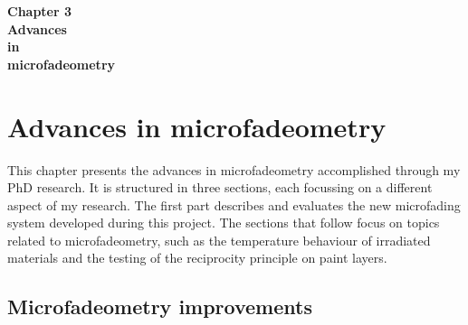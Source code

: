 


\pagecolor{mygray}


\begin{titlepage}
   \begin{center}
       \vspace*{3cm}
       {\fontsize{40pt}{46pt}\selectfont \textbf{Chapter 3}}\\       
       \vspace*{3cm}
       {\fontsize{30pt}{36pt}\selectfont \textbf{Advances} \\[1cm]
        \fontsize{30pt}{36pt}\selectfont \textbf{in} \\[1cm]
        \fontsize{30pt}{36pt}\selectfont \textbf{microfadeometry}} \\          
   \end{center}
\end{titlepage}


\restoregeometry
\pagecolor{white}


\chapter{ Advances in microfadeometry}
\label{ch:ch3_MFT-advances}

This chapter presents the advances in microfadeometry accomplished through my PhD research. It is structured in three sections, each focussing on a different aspect of my research. The first part describes and evaluates the new microfading system developed during this project. The sections that follow focus on topics related to microfadeometry, such as the temperature behaviour of irradiated materials and the testing of the reciprocity principle on paint layers.\\


\section{Microfadeometry improvements}
\label{sec:stereo-MFT}


